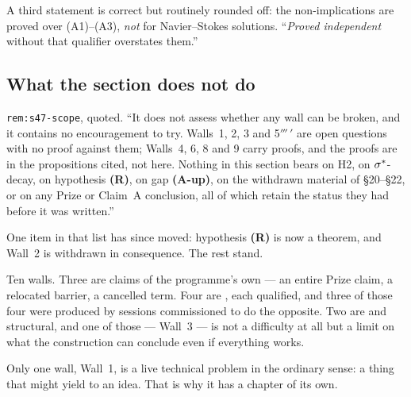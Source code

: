 A third statement is correct but routinely rounded off: the 
non-implications are proved over (A1)--(A3), \emph{not} for Navier--Stokes
solutions. ``\emph{Proved independent} without that qualifier overstates
them.''

\subsection{What the section does not do}

\begin{record}
\texttt{rem:s47-scope}, quoted. ``It does not assess whether any wall can be
broken, and it contains no encouragement to try. Walls~1, 2, 3 and
5\('''\,'\) are open questions with no proof against them; Walls~4, 6, 8 and 9
carry proofs, and the proofs are in the propositions cited, not here. Nothing
in this section bears on H2, on \(\sigma^{*}\)-decay, on hypothesis \textbf{(R)},
on gap \textbf{(A-up)}, on the withdrawn material of \S20--\S22, or on any
Prize or Claim~A conclusion, all of which retain the status they had before it
was written.''

\smallskip
One item in that list has since moved: hypothesis \textbf{(R)} is now a
theorem, and Wall~2 is withdrawn in consequence. The rest stand.
\end{record}

\begin{obsv}
\label{obs:wall-shape}
Ten walls. Three are \WITHDRAWN{} claims of the programme's own --- an entire
Prize claim, a relocated barrier, a cancelled term. Four are \IMPOSSIBLE{},
each qualified, and three of those four were produced by sessions
commissioned to do the opposite. Two are \OPEN{} and structural, and one of
those --- Wall~3 --- is not a difficulty at all but a limit on what the
construction can conclude even if everything works.

\smallskip
Only one wall, Wall~1, is a live technical problem in the ordinary sense: a
thing that might yield to an idea. That is why it has a chapter of its own.
\end{obsv}
